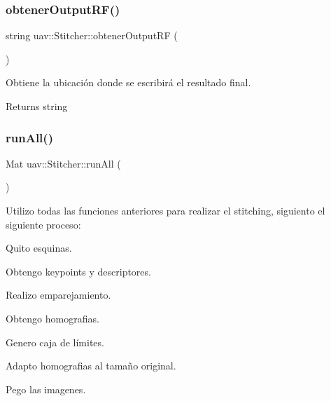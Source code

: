 \subsubsection{\texorpdfstring{obtener\+Output\+R\+F()}{obtenerOutputRF()}}
{\footnotesize\ttfamily string uav\+::\+Stitcher\+::obtener\+Output\+RF (\begin{DoxyParamCaption}{ }\end{DoxyParamCaption})\hspace{0.3cm}{\ttfamily [inline]}}



Obtiene la ubicación donde se escribirá el resultado final. 

\begin{DoxyReturn}{Returns}
string 
\end{DoxyReturn}
\mbox{\label{classuav_1_1Stitcher_a0b78aba00328166db74d46884485f3bd}} 
\subsubsection{\texorpdfstring{run\+All()}{runAll()}}
{\footnotesize\ttfamily Mat uav\+::\+Stitcher\+::run\+All (\begin{DoxyParamCaption}{ }\end{DoxyParamCaption})\hspace{0.3cm}{\ttfamily [inline]}}



Utilizo todas las funciones anteriores para realizar el stitching, siguiento el siguiente proceso\+: 


\begin{DoxyItemize}
\item Quito esquinas.
\item Obtengo keypoints y descriptores.
\item Realizo emparejamiento.
\item Obtengo homografias.
\item Genero caja de límites.
\item Adapto homografias al tamaño original.
\item Pego las imagenes. 
\end{DoxyItemize}\mbox{\label{classuav_1_1Stitcher_a650ea572d679be3b9ca07e142508a324}} 
